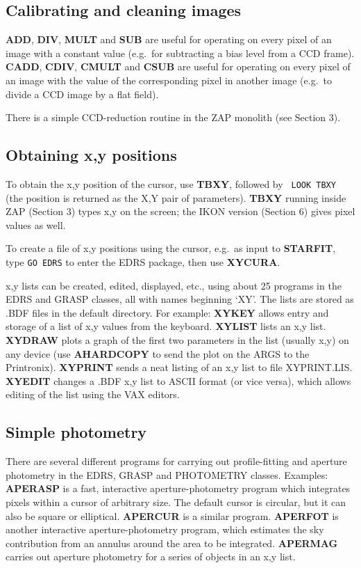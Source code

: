 \subsection {Calibrating and cleaning images}

{\bf ADD}, {\bf DIV}, {\bf MULT} and {\bf SUB} are useful for operating on
every pixel of an image with a constant value (e.g.\ for subtracting a bias
level from a CCD frame).
{\bf CADD}, {\bf CDIV}, {\bf CMULT} and {\bf CSUB} are useful for operating
on every pixel of an image with the value of the corresponding pixel in
another image (e.g.\ to divide a CCD image by a flat field).

There is a simple CCD-reduction routine in the ZAP monolith (see Section 3).

\subsection {Obtaining x,y positions}

To obtain the x,y position of the cursor, use {\bf TBXY}, followed by {\tt
LOOK TBXY} (the position is returned as the X,Y pair of parameters).
{\bf TBXY} running inside ZAP (Section 3) types x,y on the screen; the IKON version (Section 6) gives
pixel values as well.

To create a file of x,y positions using the cursor, e.g.\ as input to
{\bf STARFIT}, type {\tt GO EDRS} to enter the EDRS package, then use
{\bf XYCURA}.

x,y lists can be created, edited, displayed, etc., using about 25 programs
in the EDRS and GRASP classes, all with names beginning `XY'.
The lists are stored as .BDF files in the default directory.
For example:
{\bf XYKEY} allows entry and storage of a list of x,y values from the
keyboard.
{\bf XYLIST} lists an x,y list.
{\bf XYDRAW} plots a graph of the first two parameters in the list (usually
x,y) on any device (use {\bf AHARDCOPY} to send the plot on the ARGS to the
Printronix).
{\bf XYPRINT} sends a neat listing of an x,y list to file XYPRINT.LIS.
{\bf XYEDIT} changes a .BDF x,y list to ASCII format (or vice versa), which
allows editing of the list using the VAX editors.

\subsection {Simple photometry}

There are several different programs for carrying out profile-fitting and
aperture photometry in the EDRS, GRASP and PHOTOMETRY classes.
Examples:
{\bf APERASP} is a fast, interactive aperture-photometry program which
integrates pixels within a cursor of arbitrary size.
The default cursor is circular, but it can also be square or elliptical.
{\bf APERCUR} is a similar program.
{\bf APERFOT} is another interactive aperture-photometry program,
which estimates the sky contribution from an annulus around the
area to be integrated.
{\bf APERMAG} carries out aperture photometry for a series of objects
in an x,y list.

